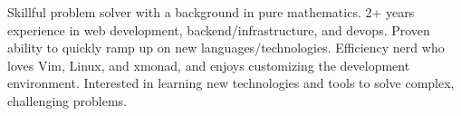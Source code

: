 

\begin{cvparagraph}

Skillful problem solver with a background in pure mathematics.
2+ years experience in web development, backend/infrastructure, and devops.
Proven ability to quickly ramp up on new languages/technologies.
Efficiency nerd who loves Vim, Linux, and xmonad, and enjoys customizing the development environment.
Interested in learning new technologies and tools to solve complex, challenging problems.
\end{cvparagraph}
